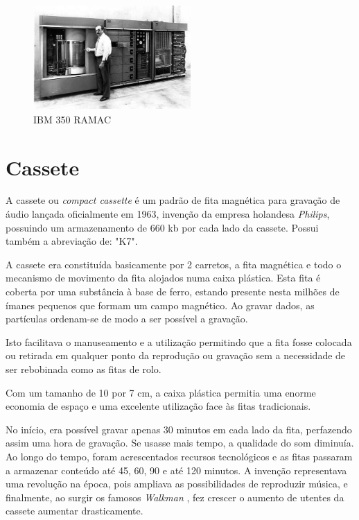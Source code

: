 \documentclass{report}
\begin{document}
	\begin{figure} [h]
		\centering
		\includegraphics[width=6cm, height=4cm]	{RAMAC.jpg}
		\caption{IBM 350 RAMAC}
	\end{figure}
	
\newpage
		
		\section{Cassete}	
	A cassete ou \textit{compact cassette}  é um padrão de fita magnética para gravação de áudio lançada oficialmente em 1963, invenção da empresa holandesa \textit{Philips}, possuindo um armazenamento de 660 \ac{kb} por cada lado da cassete. Possui também a abreviação de: "K7".
\vspace{1mm}
	
	A cassete era constituída basicamente por 2 carretos, a fita magnética e todo o mecanismo de movimento da fita alojados numa caixa plástica. Esta fita é coberta por uma substância à base de ferro, estando presente nesta milhões de ímanes pequenos que formam um campo magnético. Ao gravar dados, as partículas ordenam-se de modo a ser possível a gravação.
\vspace{1mm}

	Isto facilitava o manuseamento e a utilização permitindo que a fita fosse colocada ou retirada em qualquer ponto da reprodução ou gravação sem a necessidade de ser rebobinada como as fitas de rolo. 
\vspace{1mm}
	
	Com um tamanho de 10 por 7 cm, a caixa plástica permitia uma enorme economia de espaço e uma excelente utilização face às fitas tradicionais.
\vspace{1mm}

	No início, era possível gravar apenas 30 minutos em cada lado da fita, perfazendo assim uma hora de gravação. Se usasse mais tempo, a qualidade do som diminuía. Ao longo do tempo, foram acrescentados recursos tecnológicos e as fitas passaram a armazenar conteúdo até 45, 60, 90 e até 120 minutos. A invenção representava uma revolução na época, pois ampliava as possibilidades de reproduzir música, e finalmente, ao surgir os famosos \textit{Walkman}  , fez crescer o aumento de utentes da cassete aumentar drasticamente.
\vspace{1mm}
\end{document}
